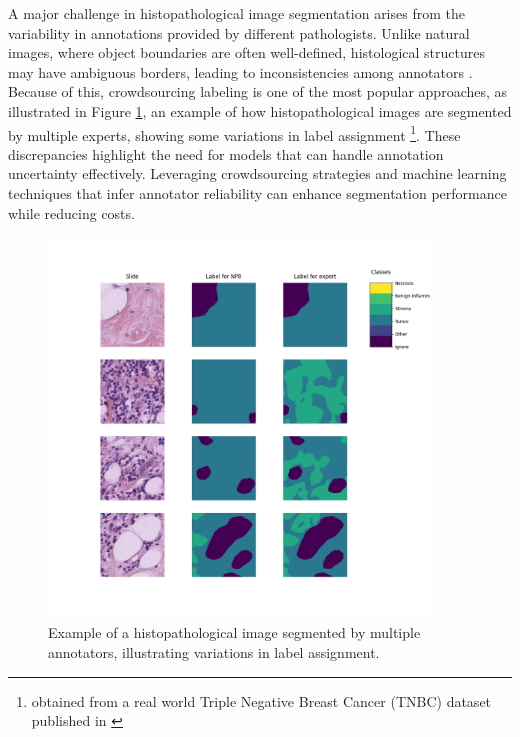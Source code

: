 A major challenge in histopathological image segmentation arises from
the variability in annotations provided by different pathologists.
Unlike natural images, where object boundaries are often
well-defined, histological structures may have ambiguous borders,
leading to inconsistencies among annotators \cite{Lopez2023}. Because of this,
crowdsourcing labeling is one of the most popular approaches, as
illustrated in Figure \ref{fig:multiannotator_segmentation},
an example of how histopathological images are segmented by
multiple experts, showing some variations in label assignment
\footnote{obtained from a real world Triple Negative Breast
Cancer (TNBC) dataset published in \cite{Lopez2023}}. These
discrepancies highlight the need for models that can handle
annotation uncertainty effectively. Leveraging crowdsourcing
strategies and machine learning techniques that infer annotator
reliability can enhance segmentation performance while reducing costs.
\begin{figure}
  \centering
  \includegraphics[width=0.9\textwidth]{Cap1/Figures/multiannotator-segmentation.png}
  \caption{Example of a histopathological image segmented by multiple
  annotators, illustrating variations in label assignment.}
  \label{fig:multiannotator_segmentation}
\end{figure}